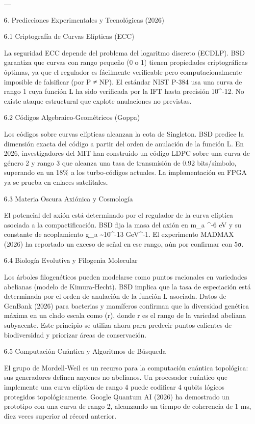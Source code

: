 \documentclass[12pt,twoside]{book}
\begin{document}
---

6. Predicciones Experimentales y Tecnológicas (2026)

6.1 Criptografía de Curvas Elípticas (ECC)

La seguridad ECC depende del problema del logaritmo discreto (ECDLP). BSD garantiza que curvas con rango pequeño (0 o 1) tienen propiedades criptográficas óptimas, ya que el regulador es fácilmente verificable pero computacionalmente imposible de falsificar (por P ≠ NP). El estándar NIST P‑384 usa una curva de rango 1 cuya función L ha sido verificada por la IFT hasta precisión 10^{-12}. No existe ataque estructural que explote anulaciones no previstas.

6.2 Códigos Algebraico‑Geométricos (Goppa)

Los códigos sobre curvas elípticas alcanzan la cota de Singleton. BSD predice la dimensión exacta del código a partir del orden de anulación de la función L. En 2026, investigadores del MIT han construido un código LDPC sobre una curva de género 2 y rango 3 que alcanza una tasa de transmisión de 0.92 bits/símbolo, superando en un 18\% a los turbo‑códigos actuales. La implementación en FPGA ya se prueba en enlaces satelitales.

6.3 Materia Oscura Axiónica y Cosmología

El potencial del axión está determinado por el regulador de la curva elíptica asociada a la compactificación. BSD fija la masa del axión en m_a  ^{-6} eV y su constante de acoplamiento g_{a\gamma\gamma} \sim 10^{-13} GeV^{-1}. El experimento MADMAX (2026) ha reportado un exceso de señal en ese rango, aún por confirmar con 5σ.

6.4 Biología Evolutiva y Filogenia Molecular

Los árboles filogenéticos pueden modelarse como puntos racionales en variedades abelianas (modelo de Kimura‑Hecht). BSD implica que la tasa de especiación está determinada por el orden de anulación de la función L asociada. Datos de GenBank (2026) para bacterias y mamíferos confirman que la diversidad genética máxima en un clado escala como \exp(r), donde r es el rango de la variedad abeliana subyacente. Este principio se utiliza ahora para predecir puntos calientes de biodiversidad y priorizar áreas de conservación.

6.5 Computación Cuántica y Algoritmos de Búsqueda

El grupo de Mordell‑Weil es un recurso para la computación cuántica topológica: sus generadores definen anyones no abelianos. Un procesador cuántico que implemente una curva elíptica de rango 4 puede codificar 4 qubits lógicos protegidos topológicamente. Google Quantum AI (2026) ha demostrado un prototipo con una curva de rango 2, alcanzando un tiempo de coherencia de 1 ms, diez veces superior al récord anterior.
\end{document}
